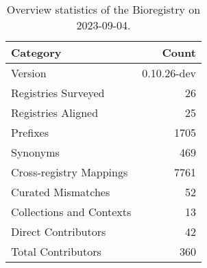 \begin{table}
\caption{Overview statistics of the Bioregistry on 2023-09-04.}
\label{tab:bioregistry-summary}
\begin{tabular}{lr}
\toprule
Category & Count \\
\midrule
Version & 0.10.26-dev \\
Registries Surveyed & 26 \\
Registries Aligned & 25 \\
Prefixes & 1705 \\
Synonyms & 469 \\
Cross-registry Mappings & 7761 \\
Curated Mismatches & 52 \\
Collections and Contexts & 13 \\
Direct Contributors & 42 \\
Total Contributors & 360 \\
\bottomrule
\end{tabular}
\end{table}
